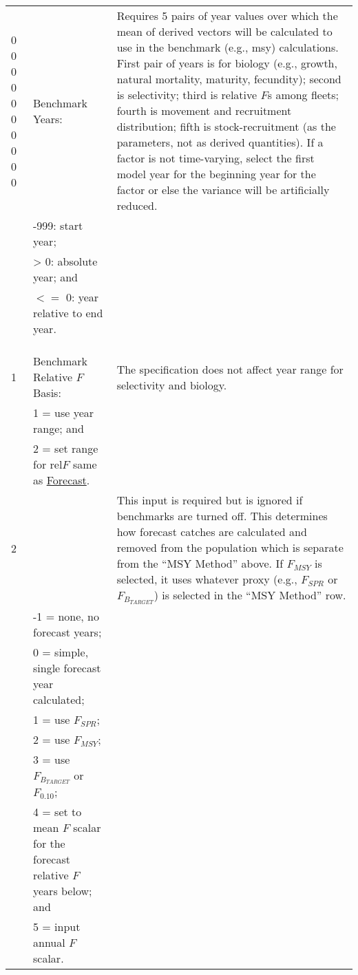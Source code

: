 \begin{landscape}
{\begin{longtable}{p{2cm} p{7cm} p{12cm}}
    
  \hline
  \multirow{1}{1cm}[-0.15cm]{\parbox{2cm}{0 0 0 0 0 0 0 0 0 0}} & Benchmark Years: & \multirow{1}{1cm}[-0.15cm]{\parbox{12cm}{Requires 5 pairs of year values over which the mean of derived vectors will be calculated to use in the benchmark (e.g., \gls{msy}) calculations. First pair of years is for biology (e.g., growth, natural mortality, maturity, fecundity); second is selectivity; third is relative $F$s among fleets; fourth is movement and recruitment distribution; fifth is stock-recruitment (as the parameters, not as derived quantities). If a factor is not time-varying, select the first model year for the beginning year for the factor or else the variance will be artificially reduced.}} \Tstrut\\
    & -999: start year; & \\
    & > 0: absolute year; and & \\
    & $<=$ 0: year relative to end year. & \Bstrut\\
    & & \\
    & & \\
    & & \\

  \pagebreak
  1 & Benchmark Relative $F$ Basis: & \multirow{1}{1cm}[-0.2cm]{\parbox{12cm}{The specification does not affect year range for selectivity and biology.}} \Tstrut\\
    & 1 = use year range; and & \\
    & 2 = set range for $\text{rel}F$ same as \hyperlink{Fcast}{Forecast}. & \Bstrut\\

  \hline
  2 & \raisebox{0.1\ht\strutbox}{\hypertarget{Fcast}{Forecast:}} & \multirow{1}{1cm}[-0.25cm]{\parbox{12cm}{This input is required but is ignored if benchmarks are turned off. This determines how forecast catches are calculated and removed from the population which is separate from the ``MSY Method'' above. If $F_{MSY}$ is selected, it uses whatever proxy (e.g., $F_{SPR}$ or $F_{B_{TARGET}}$) is selected in the ``MSY Method'' row.}} \Tstrut\\
    & -1 = none, no forecast years; & \\
    & 0 = simple, single forecast year calculated; & \\
    & 1 = use $F_{SPR}$; & \\
    & 2 = use $F_{MSY}$; & \\
    & 3 = use $F_{B_{TARGET}}$ or $F_{0.10}$; & \\
    & 4 = set to mean $F$ scalar for the forecast relative $F$ years below; and & \\
    & 5 = input annual $F$ scalar. & \Bstrut\\


\end{longtable}}
\end{landscape}
